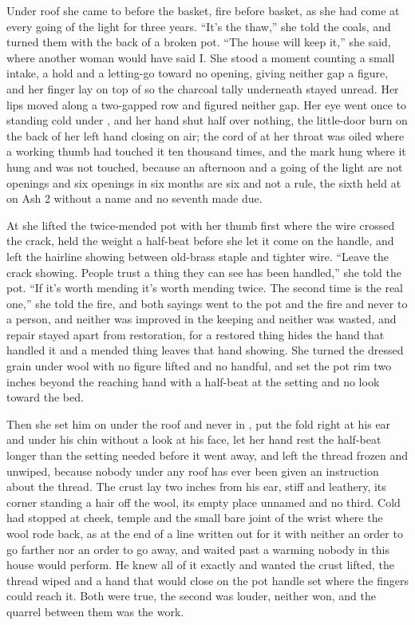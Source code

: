 Under  roof she came to  before the basket, fire before basket, as she had come at every going of the light for three years. “It's the thaw,” she told the coals, and turned them with the back of a broken pot. “The house will keep it,” she said, where another woman would have said I. She stood a moment counting a small intake, a hold and a letting-go toward no opening, giving neither gap a figure, and her finger lay on top of  so the charcoal tally underneath stayed unread. Her lips moved along a two-gapped row and figured neither gap. Her eye went once to  standing cold under , and her hand shut half over nothing, the little-door burn on the back of her left hand closing on air; the cord of  at her throat was oiled where a working thumb had touched it ten thousand times, and the mark hung where it hung and was not touched, because an afternoon and a going of the light are not openings and six openings in six months are six and not a rule, the sixth held at  on Ash 2 without a name and no seventh made due.

At  she lifted the twice-mended pot with her thumb first where the wire crossed the crack, held the weight a half-beat before she let it come on the handle, and left the hairline showing between old-brass staple and tighter wire. “Leave the crack showing. People trust a thing they can see has been handled,” she told the pot. “If it's worth mending it's worth mending twice. The second time is the real one,” she told the fire, and both sayings went to the pot and the fire and never to a person, and neither was improved in the keeping and neither was wasted, and repair stayed apart from restoration, for a restored thing hides the hand that handled it and a mended thing leaves that hand showing. She turned the dressed grain under wool with no figure lifted and no handful, and set the pot rim two inches beyond the reaching hand with a half-beat at the setting and no look toward the bed.

Then she set him on  under the roof and never in , put the fold right at his ear and under his chin without a look at his face, let her hand rest the half-beat longer than the setting needed before it went away, and left the thread frozen and unwiped, because nobody under any roof has ever been given an instruction about the thread. The crust lay two inches from his ear, stiff and leathery, its corner standing a hair off the wool, its empty place unnamed and no third. Cold had stopped at cheek, temple and the small bare joint of the wrist where the wool rode back, as at the end of a line written out for it with neither an order to go farther nor an order to go away, and  waited past a warming nobody in this house would perform. He knew all of it exactly and wanted the crust lifted, the thread wiped and a hand that would close on the pot handle set where the fingers could reach it. Both were true, the second was louder, neither won, and the quarrel between them was the work.

